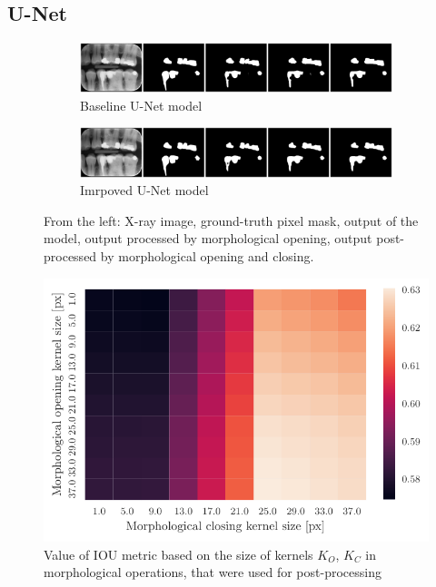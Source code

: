 \subsection{U-Net}

\begin{figure}[h]
    \centering
    \begin{subfigure}[b]{\textwidth}
        \includegraphics[width=1\linewidth]{images/unet_1_img_12.pdf}
        \caption{Baseline U-Net model}
    \end{subfigure}

    \begin{subfigure}[b]{\textwidth}
        \includegraphics[width=1\linewidth]{images/unet_2_img_12.pdf}
        \caption{Imrpoved U-Net model}
    \end{subfigure}
    \caption{From the left: X-ray image, ground-truth pixel mask, output of the model, output processed by morphological opening, output post-processed by morphological opening and closing.}
\end{figure}

\begin{figure}
    \centering
    \includegraphics[]{images/heatmap_of_unetpostproc_search.pdf}
    \caption{Value of IOU metric based on the size of kernels $K_O$, $K_C$ in morphological operations, that were used for post-processing}
    \label{fig:heatmap_postprocess}
\end{figure}

